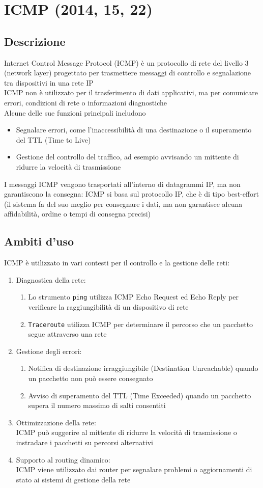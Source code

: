 \documentclass[10pt,oneside,a4paper]{article}
\begin{document}
\section{ICMP (2014, 15, 22)}
\subsection{Descrizione}
Internet Control Message Protocol (ICMP) è un protocollo di rete del livello 3 (network layer) progettato per trasmettere messaggi di controllo e segnalazione tra dispositivi in una rete IP\\
ICMP non è utilizzato per il trasferimento di dati applicativi, ma per comunicare errori, condizioni di rete o informazioni diagnostiche\\
Alcune delle sue funzioni principali includono
\begin{itemize}
\item Segnalare errori, come l'inaccessibilità di una destinazione o il superamento del TTL (Time to Live)
\item Gestione del controllo del traffico, ad esempio avvisando un mittente di ridurre la velocità di trasmissione
\end{itemize}
I messaggi ICMP vengono trasportati all'interno di datagrammi IP, ma non garantiscono la consegna: ICMP si basa sul protocollo IP, che è di tipo best-effort (il sistema fa del suo meglio per consegnare i dati, ma non garantisce alcuna affidabilità, ordine o tempi di consegna precisi)
\subsection{Ambiti d'uso}
ICMP è utilizzato in vari contesti per il controllo e la gestione delle reti:
\begin{enumerate}
\item Diagnostica della rete:
\begin{enumerate}
\item Lo strumento \texttt{ping} utilizza ICMP Echo Request ed Echo Reply per verificare la raggiungibilità di un dispositivo di rete
\item \texttt{Traceroute} utilizza ICMP per determinare il percorso che un pacchetto segue attraverso una rete
\end{enumerate}
\item Gestione degli errori:
\begin{enumerate}
\item Notifica di destinazione irraggiungibile (Destination Unreachable) quando un pacchetto non può essere consegnato
\item Avviso di superamento del TTL (Time Exceeded) quando un pacchetto supera il numero massimo di salti consentiti
\end{enumerate}
\item Ottimizzazione della rete:\\
ICMP può suggerire al mittente di ridurre la velocità di trasmissione o instradare i pacchetti su percorsi alternativi
\item Supporto al routing dinamico:\\
ICMP viene utilizzato dai router per segnalare problemi o aggiornamenti di stato ai sistemi di gestione della rete
\end{enumerate}
\end{document}
